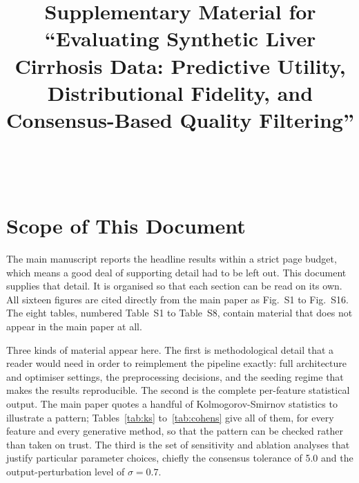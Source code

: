 \documentclass[journal,onecolumn]{IEEEtran}
\begin{document}
\title{Supplementary Material for\\
``Evaluating Synthetic Liver Cirrhosis Data: Predictive Utility, Distributional Fidelity, and Consensus-Based Quality Filtering''}

\author{\\
\\
}

\maketitle

\section{Scope of This Document}

The main manuscript reports the headline results within a strict page budget, which means a good deal of supporting detail had to be left out. This document supplies that detail. It is organised so that each section can be read on its own. All sixteen figures are cited directly from the main paper as Fig.~S1 to Fig.~S16. The eight tables, numbered Table~S1 to Table~S8, contain material that does not appear in the main paper at all.

Three kinds of material appear here. The first is methodological detail that a reader would need in order to reimplement the pipeline exactly: full architecture and optimiser settings, the preprocessing decisions, and the seeding regime that makes the results reproducible. The second is the complete per-feature statistical output. The main paper quotes a handful of Kolmogorov-Smirnov statistics to illustrate a pattern; Tables~\ref{tab:ks} to~\ref{tab:cohens} give all of them, for every feature and every generative method, so that the pattern can be checked rather than taken on trust. The third is the set of sensitivity and ablation analyses that justify particular parameter choices, chiefly the consensus tolerance of 5.0 and the output-perturbation level of $\sigma = 0.7$.
\end{document}
